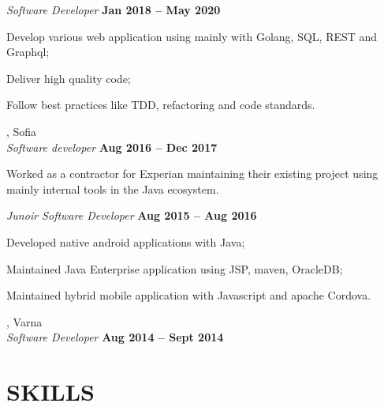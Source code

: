 \documentclass[margin,line]{resume}
\begin{document}
\begin{resume}
    \textsl{Software Developer} \hfill \textbf{Jan 2018 {--} May 2020}\\
    \begin{list2}
        \item Develop various web application using mainly with
          Golang, SQL, REST and Graphql;
	\item Deliver high quality code;\@
        \item Follow best practices like TDD, refactoring and code standards.\@
    \end{list2}

    \textbf{}, Sofia \vspace{2mm}\\\vspace{1mm}%
    \textsl{Software developer} \hfill \textbf{Aug 2016 {--} Dec 2017}\\
    \begin{list2}
        \item Worked as a contractor for Experian maintaining their
          existing project using mainly internal tools in the Java
          ecosystem.
    \end{list2}

    \textsl{Junoir Software Developer} \hfill \textbf{Aug 2015 {--} Aug 2016}\\
    \begin{list2}
        \item Developed native android applications with Java;
	\item Maintained Java Enterprise application using JSP, maven, OracleDB;\@
        \item Maintained hybrid mobile application with Javascript and apache Cordova.
    \end{list2}

    \textbf{}, Varna \vspace{2mm}\\\vspace{1mm}%
    \textsl{Software Developer} \hfill \textbf{Aug 2014 {--} Sept 2014}


\sectionline%

    \section{\mysidestyle\textbf{\large{S}\small{KILLS}}}


\end{resume}
\end{document}
